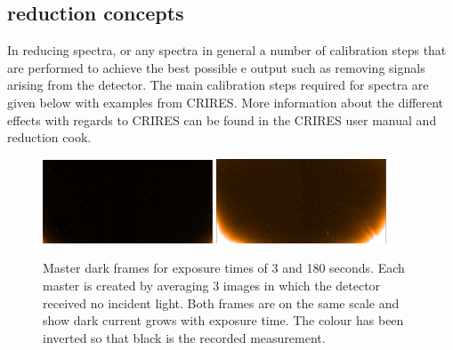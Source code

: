 \subsection{\nir{} reduction concepts}
\label{subsec:nirreduction}
In reducing \nir{} spectra, or any spectra in general a number of calibration steps that are performed to achieve the best possible e output such as removing signals arising from the detector. The main calibration steps required for \nir{} spectra are given below with examples from {CRIRES}. More information about the different effects with regards to CRIRES can be found in the CRIRES user manual and reduction cook.
\begin{figure}[h]
    \centering
    \includegraphics[width=0.45\textwidth]{figures/reduction/MasterDarkFlat_1.png}
    \includegraphics[width=0.45\textwidth]{figures/reduction/MasterDarkSpec_1.png}
    \caption{Master dark frames for exposure times of 3 and 180 seconds.
Each master is created by averaging 3 images in which the detector received no incident light.
Both frames are on the same scale and show dark current grows with exposure time.
The colour has been inverted so that black is the recorded measurement.}
    \label{fig:darkcurrent_colour}
\end{figure}

